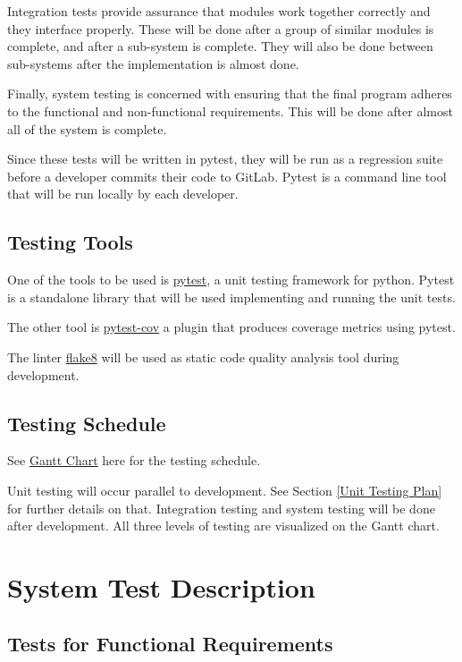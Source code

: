 \documentclass[12pt, titlepage]{article}
\begin{document}
Integration tests provide assurance that modules work together correctly and they interface properly. These will be done after a group of similar modules is complete, and after a sub-system is complete. They will also be done between sub-systems after the implementation is almost done.

Finally, system testing is concerned with ensuring that the final program adheres to the functional and non-functional requirements. This will be done after almost all of the system is complete.

Since these tests will be written in pytest, they will be run as a regression suite before a developer commits their code to GitLab. Pytest is a command line tool that will be run locally by each developer.

\subsection{Testing Tools}

One of the tools to be used is \href{https://docs.pytest.org/en/latest/}{pytest}, a unit testing framework for python. Pytest is a standalone library that will be used implementing and running the unit tests.

The other tool is \href{https://pypi.org/project/pytest-cov/}{pytest-cov} a plugin that produces coverage metrics using pytest.

The linter \href{https://flake8.pycqa.org/en/latest/}{flake8} will be used as static code quality analysis tool during development.

\subsection{Testing Schedule}
		
See \href{https://gitlab.cas.mcmaster.ca/guinnesj/google-images-downloader/-/blob/master/ProjectSchedule/Gantt-Chart.pdf}{Gantt Chart} here for the testing schedule.

Unit testing will occur parallel to development. See Section \ref{Unit Testing Plan} for further details on that. Integration testing and system testing will be done after development. All three levels of testing are visualized on the Gantt chart.

\section{System Test Description}

	
\subsection{Tests for Functional Requirements}
\end{document}
